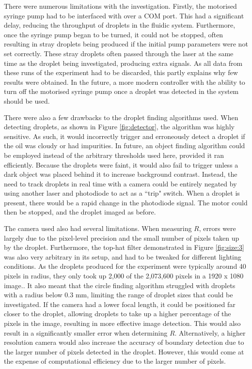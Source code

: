\documentclass{physics_article_B}
\begin{document}
    There were numerous limitations with the investigation. Firstly, the motorised syringe pump had to be interfaced with over a COM port. This had a significant delay, reducing the throughput of droplets in the fluidic system. Furthermore, once the syringe pump began to be turned, it could not be stopped, often resulting in stray droplets being produced if the initial pump parameters were not set correctly. These stray droplets often passed through the laser at the same time as the droplet being investigated, producing extra signals. As all data from these runs of the experiment had to be discarded, this partly explains why few results were obtained. In the future, a more modern controller with the ability to turn off the motorised syringe pump once a droplet was detected in the system should be used.
    
    There were also a few drawbacks to the droplet finding algorithms used. When detecting droplets, as shown in Figure \ref{fig:detector}, the algorithm was highly sensitive. As such, it would incorrectly trigger and erroneously detect a droplet if the oil was cloudy or had impurities. In future, an object finding algorithm could be employed instead of the arbitrary thresholds used here, provided it ran efficiently. Because the droplets were faint, it would also fail to trigger unless a dark object was placed behind it to increase background contrast. Instead, the need to track droplets in real time with a camera could be entirely negated by using another laser and photodiode to act as a ``trip" switch. When a droplet is present, there would be a rapid change in the photodiode signal. The motor could then be stopped, and the droplet imaged as before.
    
    The camera used also had several limitations. When measuring $R$, errors were largely due to the pixel-level precision and the small number of pixels taken up by the droplet. Furthermore, the top-hat filter demonstrated in Figure \ref{fig:size:3} was also very arbitrary in its setup, and had to be tweaked for different lighting conditions. As the droplets produced for the experiment were typically around 40 pixels in radius, they only took up 2,000 of the 2,073,600 pixels in a 1920 x 1080 image.. It also meant that the circle finding algorithm struggled with droplets with a radius below 0.3 mm, limiting the range of droplet sizes that could be investigated. If the camera had a lower focal length, it could be positioned far closer to the droplet, allowing droplets to take up a higher percentage of the pixels in the image, resulting in more effective image detection. This would also result in a significantly smaller error when determining $R$. Alternatively, a higher resolution camera would also increase the accuracy of boundary detection due to the larger number of pixels detected in the droplet. However, this would come at the expense of computational efficiency due to the larger number of pixels. 
    
\end{document}
